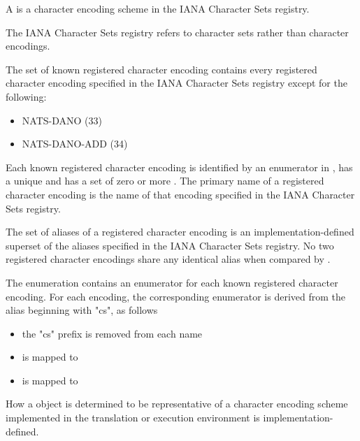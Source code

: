 \documentclass{wg21}
\begin{document}
\begin{addedblock}

\pnum A  is a character encoding scheme in the IANA Character Sets registry.
\begin{note}
    The IANA Character Sets registry refers to character sets rather than character encodings.
\end{note}



The set of known registered character encoding contains every registered character encoding specified in the IANA Character Sets registry except for the following:
\begin{itemize}
\item NATS-DANO (33)
\item NATS-DANO-ADD	(34)
\end{itemize}

Each known registered character encoding is identified by an enumerator in , has a unique  and has a set of zero or more .
The primary name of a registered character encoding is the name of that encoding specified in the IANA Character Sets registry.


The set of aliases of a registered character encoding is an implementation-defined superset of the aliases specified in the IANA Character Sets registry.
No two registered character encodings share any identical alias when compared by \emph{}.

\begin{note}
The  enumeration contains an enumerator for each known registered character encoding.
For each encoding, the corresponding enumerator is derived from the alias beginning with "cs", as follows
\begin{itemize}
    \item the "cs" prefix is removed from each name
    \item {} is mapped to 
    \item {} is mapped to 
    \end{itemize}
\end{note}

How a  object is determined to be representative of a character encoding scheme implemented in the translation or execution environment is implementation-defined.


\end{addedblock}
\end{document}
